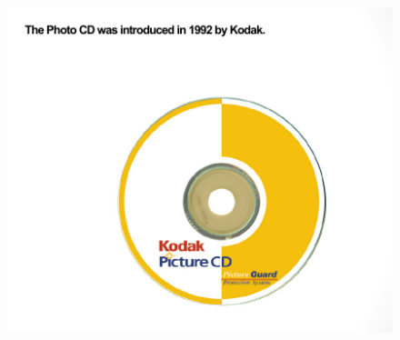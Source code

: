 \documentclass{beamer}
\begin{document}
\begin{frame}
	\begin{figure}
		\centering
		\includegraphics[scale=0.4]{111.jpg}
	\end{figure}
\end{frame}
\end{document}
